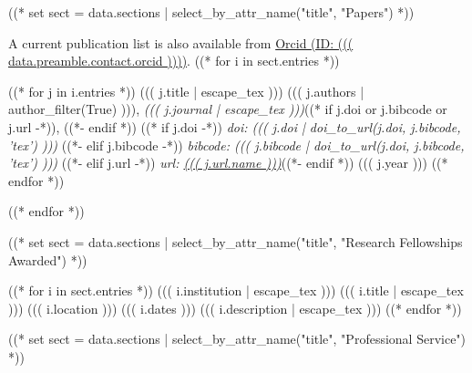 \documentclass[10pt, letterpaper]{awesome-cv}
\begin{document}
((* set  sect = data.sections | select_by_attr_name("title", "Papers") *))

A current publication list is also available from 
\href{https://orcid.org/((( data.preamble.contact.orcid )))}
     {Orcid (ID: ((( data.preamble.contact.orcid ))))}.
((* for i in sect.entries *))
\begin{cvhonors}
  ((* for j in i.entries *))
  \cvhonor
    {((( j.title | escape_tex )))}
    {((( j.authors | author_filter(True) ))),
     {\slshape\color{awesome} ((( j.journal | escape_tex )))}((* if j.doi or j.bibcode or j.url -*)), ((*-  endif *))
     ((* if j.doi -*))
     {\slshape\color{graytext} doi: ((( j.doi | doi_to_url(j.doi, j.bibcode, 'tex') )))}
     ((*- elif j.bibcode -*))
     {\slshape\color{graytext} bibcode: ((( j.bibcode | doi_to_url(j.doi, j.bibcode, 'tex') )))}
     ((*- elif j.url -*))
     {\slshape\color{graytext} url: \href{((( j.url.link )))}{((( j.url.name )))}}((*- endif *))}
    {}
    {((( j.year )))}
  ((* endfor *))
\end{cvhonors}
((* endfor *))

((* set sect = data.sections | select_by_attr_name("title", "Research Fellowships Awarded") *))
\begin{cventries}
((* for i in sect.entries *))
\cventry
  {((( i.institution | escape_tex )))}
  {((( i.title | escape_tex )))}
  {((( i.location )))}
  {((( i.dates )))}
  {((( i.description | escape_tex )))}
((* endfor *))
\end{cventries}

((* set sect = data.sections | select_by_attr_name("title", "Professional Service") *))
\end{document}
